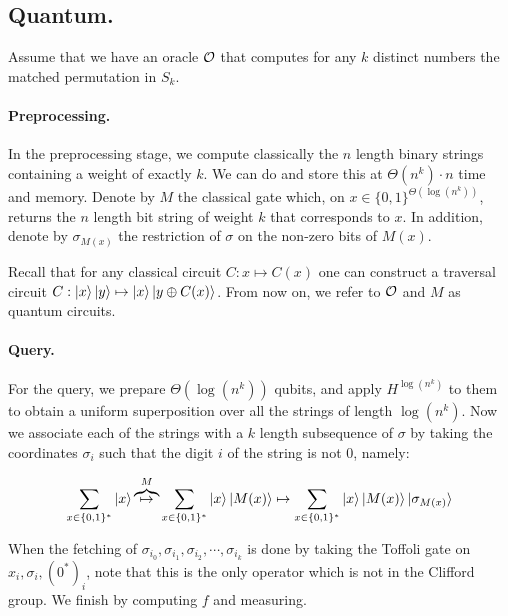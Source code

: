 \documentclass[manuscript,screen,review]{acmart}
\begin{document}
\subsection{Quantum.} Assume that we have an oracle $\mathcal{O}$ that computes for any $k$ distinct numbers the matched permutation in $S_{k}$.

\paragraph{Preprocessing.} In the preprocessing stage, we compute classically the $n$ length binary strings containing a weight of exactly $k$. We can do and store this at $\Theta(n^{k}) \cdot n$ time and memory. Denote by $M$ the classical gate which, on $x \in \{0,1\}^{\Theta\left( \log(n^k) \right)}$, returns the $n$ length bit string of weight $k$ that corresponds to $x$. In addition, denote by $\sigma_{M(x)}$ the restriction of $\sigma$ on the non-zero bits of $M\left( x \right)$.    

Recall that for any classical circuit $C : x \mapsto C(x) $ one can construct a traversal circuit $C : \ket{x}\ket{y} \mapsto \ket{x}\ket{y \oplus C(x)}$. From now on, we refer to $\mathcal{O}$ and $M$ as quantum circuits.   

\paragraph{Query.} For the query, we prepare $\Theta (\log(n^k) )$ qubits, and apply $H^{\log(n^k)}$ to them to obtain a uniform superposition over all the strings of length $\log(n^k)$. Now we associate each of the strings with a $k$ length subsequence of $\sigma$ by taking the coordinates $\sigma_{i}$ such that the digit $i$ of the string is not $0$, namely: 

\begin{equation*}
  \begin{split}
    \sum_{x\in \{0,1\}^{*}}{\ket{x}} \overbrace{\mapsto}^M \sum_{x\in \{0,1\}^{*}}{\ket{x}\ket{M(x)}} \mapsto  \sum_{x\in \{0,1\}^{*}}{\ket{x}\ket{M(x)}\ket{\sigma_{M(x)} }}
  \end{split}
\end{equation*}


When the fetching of $\sigma_{i_0}, \sigma_{i_1}, \sigma_{i_2}, \cdots, \sigma_{i_k}$ is done by taking the Toffoli gate on $x_i, \sigma_i, (0^*)_i$, note that this is the only operator which is not in the Clifford group. We finish by computing $f$ and measuring.
\end{document}
